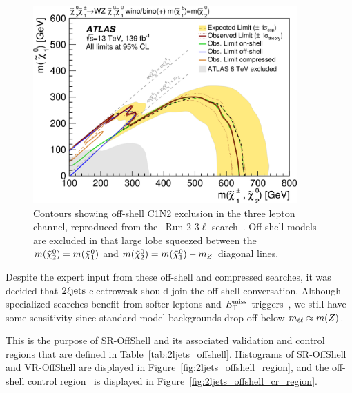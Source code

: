 \begin{figure}[tp]
\centering
\includegraphics[width=0.9\textwidth]{figures/2ljets_compressed_3l_ins1866951_fig_16a.png}
\caption[
Contours showing off-shell C1N2 exclusion from the \atlas\ Run-2 $3\ell$ search
]{%
Contours showing off-shell C1N2 exclusion in the three lepton channel,
reproduced from the \atlas\ Run-2 $3\ell$
search~\cite{atlas_rjr_3l_SUSY_2019_09, hepdata.95751}.
Off-shell models are excluded in that large lobe squeezed between the
$m(\tilde\chi^0_2) = m(\tilde\chi^0_1)$ and
$m(\tilde\chi^0_2) = m(\tilde\chi^0_1) - m_Z$ diagonal lines.
}
\label{fig:ljets_offshell_3l_exclusion}
\end{figure}

Despite the expert input from these off-shell and compressed searches, it was
decided that $2\ell\mathrm{jets}$-electroweak should join the off-shell
conversation.
Although specialized searches benefit from softer leptons and $E_\mathrm{T}^\mathrm{miss}$
triggers~\cite{atlas_susy_compressed_2l_2018_run2},
we still have some sensitivity since standard model backgrounds drop off
below $m_{\ell\ell} \approx m(Z)$.

This is the purpose of SR-OffShell and its associated validation and control
regions that are defined in Table~\ref{tab:2ljets_offshell}.
Histograms of SR-OffShell and VR-OffShell are displayed in
Figure~\ref{fig:2ljets_offshell_region}, and the off-shell control region
\crdy\ is displayed in Figure~\ref{fig:2ljets_offshell_cr_region}.


